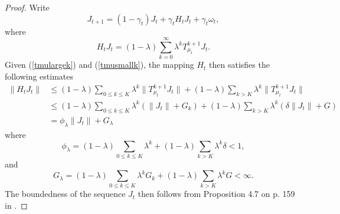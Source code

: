 \documentclass[12pt,a4paper]{amsart}
\numberwithin{equation}{section}
\theoremstyle{plain}
\theoremstyle{definition}
\begin{document}
\begin{proof}
	Write
	$$
	J_{t+1 } = (1 -\gamma_t) J_t + \gamma_t H_t J_t + \gamma_t \omega_t,
	$$
	where 
	$$
	H_t J_t =(1-\lambda) \sum_{k=0}^{\infty} \lambda^k T_{\mu_t}^{k+1} J_t.  
	$$
	Given (\ref{tmulargek}) and (\ref{tmusmallk}), the mapping $H_t$ then satisfies the following estimates
	$$
	\begin{aligned}
		\|H_t J_t\| & \le (1-\lambda)\sum_{0\le k \le K} \lambda^k \|T_{\mu_t}^{k+1}J_t\| + (1-\lambda)\sum_{ k > K} \lambda^k \|T_{\mu_t}^{k+1}J_t\| \\
		& \le (1-\lambda)\sum_{0\le k \le K} \lambda^k \left(\|J_t\| + G_k\right) + (1-\lambda)\sum_{ k > K} \lambda^k \left(\delta\|J_t\| + G \right) \\
		& = \phi_{\lambda} \|J_t\| + G_{\lambda}
	\end{aligned}
	$$
	where 
	$$
	\phi_{\lambda} = (1-\lambda)\sum_{0\le k \le K} \lambda^k + (1-\lambda)\sum_{ k > K} \lambda^k \delta < 1,
	$$
	and 
	$$
	G_{\lambda} = (1-\lambda)\sum_{0\le k \le K} \lambda^k  G_k + (1-\lambda)\sum_{ k > K} \lambda^k G < \infty. 
	$$
	The boundedness of the sequence $J_t$ then follows from Proposition 4.7 on p. 159 in \cite{BertsekasTsitsiklis96}. 
\end{proof}
\end{document}
